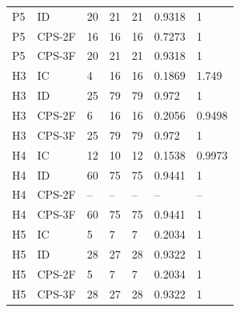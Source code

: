 \begin{longtable}{lllllll}
P5 & ID & 20 & 21 & 21 & 0.9318 & 1 \\
P5 & CPS-2F & 16 & 16 & 16 & 0.7273 & 1 \\
P5 & CPS-3F & 20 & 21 & 21 & 0.9318 & 1 \\
H3 & IC & 4 & 16 & 16 & 0.1869 & 1.749 \\
H3 & ID & 25 & 79 & 79 & 0.972 & 1 \\
H3 & CPS-2F & 6 & 16 & 16 & 0.2056 & 0.9498 \\
H3 & CPS-3F & 25 & 79 & 79 & 0.972 & 1 \\
H4 & IC & 12 & 10 & 12 & 0.1538 & 0.9973 \\
H4 & ID & 60 & 75 & 75 & 0.9441 & 1 \\
H4 & CPS-2F & -- & -- & -- & -- & -- \\
H4 & CPS-3F & 60 & 75 & 75 & 0.9441 & 1 \\
H5 & IC & 5 & 7 & 7 & 0.2034 & 1 \\
H5 & ID & 28 & 27 & 28 & 0.9322 & 1 \\
H5 & CPS-2F & 5 & 7 & 7 & 0.2034 & 1 \\
H5 & CPS-3F & 28 & 27 & 28 & 0.9322 & 1 \\
\bottomrule
\end{longtable}
\endgroup
